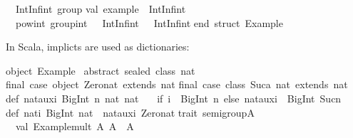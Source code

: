 \begin{isabellebody}
\begin{isamarkuptext}
\ \ IntInf{\isachardot}int\ group{\isacharsemicolon}\isanewline
\isanewline
val\ example\ {\isacharcolon}\ IntInf{\isachardot}int\ {\isacharequal}\isanewline
\ \ pow{\isacharunderscore}int\ group{\isacharunderscore}int\ {\isacharparenleft}{}{}\ {\isacharcolon}\ IntInf{\isachardot}int{\isacharparenright}\ {\isacharparenleft}{\isachartilde}{}\ {\isacharcolon}\ IntInf{\isachardot}int{\isacharparenright}{\isacharsemicolon}\isanewline
\isanewline
end{\isacharsemicolon}\ {\isacharparenleft}{\isacharasterisk}struct\ Example{\isacharasterisk}{\isacharparenright}\isanewline%
\end{isamarkuptext}%
\isamarkuptrue%
%
\endisatagquotetypewriter
{\isafoldquotetypewriter}%
%
\isadelimquotetypewriter
%
\endisadelimquotetypewriter
%
\begin{isamarkuptext}%
\noindent In Scala, implicts are used as dictionaries:%
\end{isamarkuptext}%
\isamarkuptrue%
%
\isadeliminvisible
%
\endisadeliminvisible
%
\isataginvisible
%
\endisataginvisible
{\isafoldinvisible}%
%
\isadeliminvisible
%
\endisadeliminvisible
%
\isadelimquotetypewriter
%
\endisadelimquotetypewriter
%
\isatagquotetypewriter
%
\begin{isamarkuptext}%
object\ Example\ {\isacharbraceleft}\isanewline
\isanewline
abstract\ sealed\ class\ nat\isanewline
final\ case\ object\ Zero{\isacharunderscore}nat\ extends\ nat\isanewline
final\ case\ class\ Suc{\isacharparenleft}a{\isacharcolon}\ nat{\isacharparenright}\ extends\ nat\isanewline
\isanewline
def\ nat{\isacharunderscore}aux{\isacharparenleft}i{\isacharcolon}\ BigInt{\isacharcomma}\ n{\isacharcolon}\ nat{\isacharparenright}{\isacharcolon}\ nat\ {\isacharequal}\isanewline
\ \ {\isacharparenleft}if\ {\isacharparenleft}i\ {\isacharless}{\isacharequal}\ BigInt{\isacharparenleft}{}{\isacharparenright}{\isacharparenright}\ n\ else\ nat{\isacharunderscore}aux{\isacharparenleft}i\ {\isacharminus}\ BigInt{\isacharparenleft}{}{\isacharparenright}{\isacharcomma}\ Suc{\isacharparenleft}n{\isacharparenright}{\isacharparenright}{\isacharparenright}\isanewline
\isanewline
def\ nat{\isacharparenleft}i{\isacharcolon}\ BigInt{\isacharparenright}{\isacharcolon}\ nat\ {\isacharequal}\ nat{\isacharunderscore}aux{\isacharparenleft}i{\isacharcomma}\ Zero{\isacharunderscore}nat{\isacharparenright}\isanewline
\isanewline
trait\ semigroup{\isacharbrackleft}A{\isacharbrackright}\ {\isacharbraceleft}\isanewline
\ \ val\ {\isacharbackquote}Example{\isachardot}mult{\isacharbackquote}{\isacharcolon}\ {\isacharparenleft}A{\isacharcomma}\ A{\isacharparenright}\ {\isacharequal}{\isachargreater}\ A\isanewline

\end{isamarkuptext}
\end{isabellebody}
